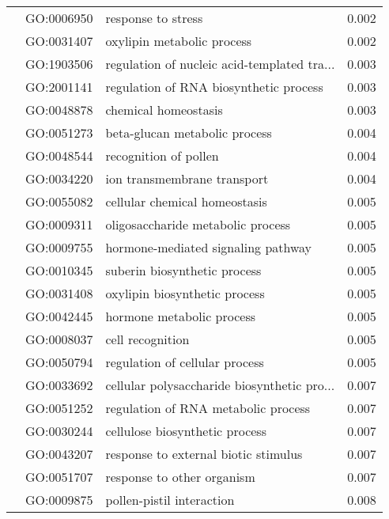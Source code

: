 \begin{longtable}{lllr}
   & GO:0006950 &                           response to stress &         0.002 \\
   & GO:0031407 &                   oxylipin metabolic process &         0.002 \\
   & GO:1903506 &  regulation of nucleic acid-templated tra... &         0.003 \\
   & GO:2001141 &       regulation of RNA biosynthetic process &         0.003 \\
   & GO:0048878 &                         chemical homeostasis &         0.003 \\
   & GO:0051273 &                beta-glucan metabolic process &         0.004 \\
   & GO:0048544 &                        recognition of pollen &         0.004 \\
   & GO:0034220 &                  ion transmembrane transport &         0.004 \\
   & GO:0055082 &                cellular chemical homeostasis &         0.005 \\
   & GO:0009311 &            oligosaccharide metabolic process &         0.005 \\
   & GO:0009755 &           hormone-mediated signaling pathway &         0.005 \\
   & GO:0010345 &                 suberin biosynthetic process &         0.005 \\
   & GO:0031408 &                oxylipin biosynthetic process &         0.005 \\
   & GO:0042445 &                    hormone metabolic process &         0.005 \\
   & GO:0008037 &                             cell recognition &         0.005 \\
   & GO:0050794 &               regulation of cellular process &         0.005 \\
   & GO:0033692 &  cellular polysaccharide biosynthetic pro... &         0.007 \\
   & GO:0051252 &          regulation of RNA metabolic process &         0.007 \\
   & GO:0030244 &               cellulose biosynthetic process &         0.007 \\
   & GO:0043207 &         response to external biotic stimulus &         0.007 \\
   & GO:0051707 &                   response to other organism &         0.007 \\
   & GO:0009875 &                    pollen-pistil interaction &         0.008 \\

\end{longtable}
